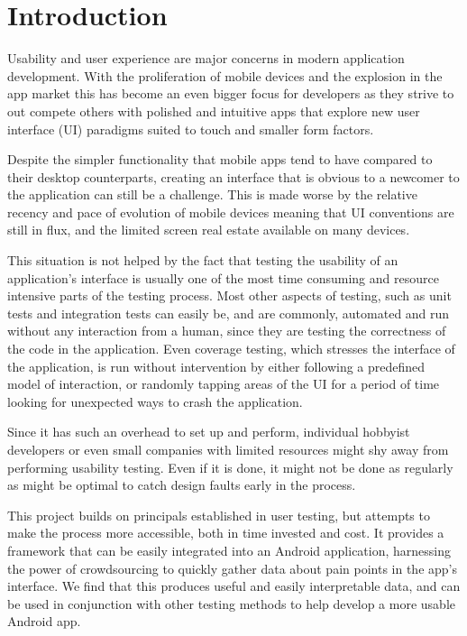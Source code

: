 \chapter{Introduction}

Usability and user experience are major concerns in modern application
development. With the proliferation of mobile devices and the explosion in the
app market this has become an even bigger focus for developers as they strive
to out compete others with polished and intuitive apps that explore new user
interface (UI) paradigms suited to touch and smaller form factors.

Despite the simpler functionality that mobile apps tend to have compared to
their desktop counterparts, creating an interface that is obvious to a newcomer
to the application can still be a challenge. This is made worse by the relative
recency and pace of evolution of mobile devices meaning that UI conventions are
still in flux, and the limited screen real estate available on many devices.

This situation is not helped by the fact that testing the usability of an
application's interface is usually one of the most time consuming and resource
intensive parts of the testing process. Most other aspects of testing, such as
unit tests and integration tests can easily be, and are commonly, automated and
run without any interaction from a human, since they are testing the
correctness of the code in the application. Even coverage testing, which
stresses the interface of the application, is run without intervention by
either following a predefined model of interaction, or randomly tapping areas
of the UI for a period of time looking for unexpected ways to crash the
application.

Since it has such an overhead to set up and perform, individual hobbyist
developers or even small companies with limited resources might shy away from
performing usability testing. Even if it is done, it might not be done as
regularly as might be optimal to catch design faults early in the process.

This project builds on principals established in user testing, but attempts
to make the process more accessible, both in time invested and cost. It 
provides a framework that can be easily integrated into an Android application,
harnessing the power of crowdsourcing to quickly gather data about pain
points in the app's interface. We find that this produces useful and
easily interpretable data, and can be used in conjunction with other
testing methods to help develop a more usable Android app.
